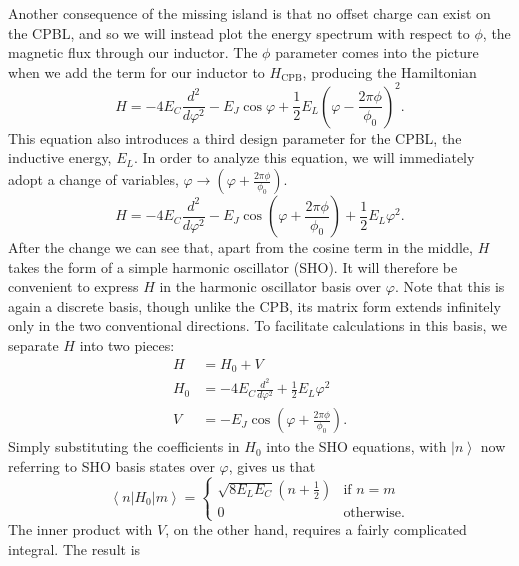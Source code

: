 \documentclass[twocolumn]{revtex4}
\newcommand{\ket}[1]{\left| #1 \right>}
\newcommand{\innerp}[3]{\textstyle\left< #1 \left| #2 \right| #3 \right>}
\begin{document}
Another consequence of the missing island is that no offset charge can
exist on the CPBL, and so we will instead plot the energy spectrum
with respect to $\phi$, the magnetic flux through our inductor. The
$\phi$ parameter comes into the picture when we add the term for our
inductor to $H_{\text{CPB}}$, producing the Hamiltonian
\begin{equation}
  H = -4E_C\frac{d^2}{d\varphi^2}-E_J\cos{\varphi}+\frac{1}{2}
  E_L\left(\varphi-\frac{2\pi\phi}{\phi_0} \right)^2.
\end{equation}
This equation also introduces a third design parameter for the CPBL,
the inductive energy, $E_L$. In order to analyze this equation, we
will immediately adopt a change of variables, $\varphi \rightarrow
(\varphi + \frac{2\pi\phi}{\phi_0})$.
\begin{equation}
  \label{H}
  H = -4E_C\frac{d^2}{d\varphi^2}-E_J\cos\left(\varphi+
    \frac{2\pi\phi}{\phi_0}\right)+
  \frac{1}{2} E_L\varphi^2.
\end{equation}
After the change we can see that, apart from the cosine term in the
middle, $H$ takes the form of a simple harmonic oscillator (SHO). It
will therefore be convenient to express $H$ in the harmonic oscillator
basis over $\varphi$. Note that this is again a discrete basis, though
unlike the CPB, its matrix form extends infinitely only in the two
conventional directions. To facilitate calculations in this basis, we
separate $H$ into two pieces:
\begin{align}
  H & = H_0 + V\\
  H_0 & = -4E_C\frac{d^2}{d\varphi^2} +
  \frac{1}{2} E_L\varphi^2 \\
  V & = -E_J\cos\left(\varphi + \frac{2\pi\phi}{\phi_0}\right).
\end{align}
Simply substituting the coefficients in $H_0$ into the SHO equations,
with $\ket{n}$ now referring to SHO basis states over $\varphi$, gives
us that
\begin{equation}
  \innerp{n}{H_0}{m} = 
  \begin{cases}
    \sqrt{8E_LE_C}\left(n+\frac{1}{2}\right) & \text{if $n=m$} \\
    0 & \text{otherwise.}
  \end{cases}
  \label{inner-H0}
\end{equation}
The inner product with $V$, on the other hand, requires a fairly
complicated integral. The result is
\end{document}
